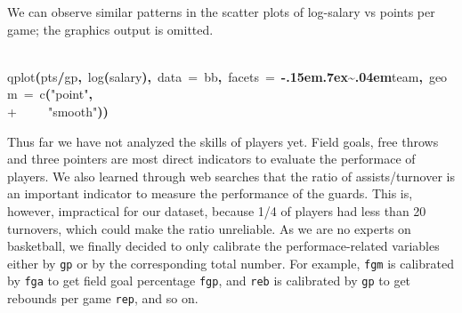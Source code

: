 \documentclass[english]{article}
\newenvironment{dummy}{\par}{\par}
\newcommand{\hlfunctioncall}[1]{\textcolor[rgb]{1,0,0}{#1}}%
\newcommand{\hlstring}[1]{\textcolor[rgb]{0.6,0.6,1}{#1}}%
\newcommand{\hlkeyword}[1]{\textcolor[rgb]{0,0,0}{\textbf{#1}}}%
\newcommand{\hlargument}[1]{\textcolor[rgb]{0.694117647058824,0.247058823529412,0.0196078431372549}{#1}}%
\newcommand{\hlsymbol}[1]{\textcolor[rgb]{0,0,0}{#1}}%
\newcommand{\hlprompt}[1]{\textcolor[rgb]{0,0,0}{#1}}%
\def\urltilda{\kern -.15em\lower .7ex\hbox{\~{}}\kern .04em}%
\newcommand{\hlstd}[1]{\textcolor[rgb]{0,0,0}{#1}}%
\begin{document}
We can observe similar patterns in the scatter plots of log-salary
vs points per game; the graphics output is omitted.
\begin{dummy}
\hspace*{\fill}\\
\hlstd{}\ttfamily\noindent
\hlprompt{\usebox{\hlnormalsizeboxgreaterthan}{\ }}\hlfunctioncall{qplot}\hlkeyword{(}\hlsymbol{pts}\hlkeyword{/}\hlsymbol{gp}\hlkeyword{,}{\ }\hlfunctioncall{log}\hlkeyword{(}\hlsymbol{salary}\hlkeyword{)}\hlkeyword{,}{\ }\hlargument{data}{\ }\hlargument{=}{\ }\hlsymbol{bb}\hlkeyword{,}{\ }\hlargument{facets}{\ }\hlargument{=}{\ }\hlkeyword{\urltilda{}}\hlsymbol{team}\hlkeyword{,}{\ }\hlargument{geom}{\ }\hlargument{=}{\ }\hlfunctioncall{c}\hlkeyword{(}\hlstring{"point"}\hlkeyword{,}\hspace*{\fill}\\
\hlstd{}\hlprompt{+{\ }}{\ }{\ }{\ }{\ }\hlstring{"smooth"}\hlkeyword{)}\hlkeyword{)}\mbox{}
\normalfont
\hspace*{\fill}\\
\hlstd{}
\end{dummy}
Thus far we have not analyzed the skills of players yet. Field goals,
free throws and three pointers are most direct indicators to evaluate
the performace of players. We also learned through web searches that
the ratio of assists/turnover is an important indicator to measure
the performance of the guards. This is, however, impractical for our
dataset, because 1/4 of players had less than 20 turnovers, which
could make the ratio unreliable. As we are no experts on basketball,
we finally decided to only calibrate the performace-related variables
either by \texttt{gp} or by the corresponding total number. For example,
\texttt{fgm} is calibrated by \texttt{fga} to get field goal percentage
\texttt{fgp}, and \texttt{reb} is calibrated by \texttt{gp} to get
rebounds per game \texttt{rep}, and so on.
\end{document}
